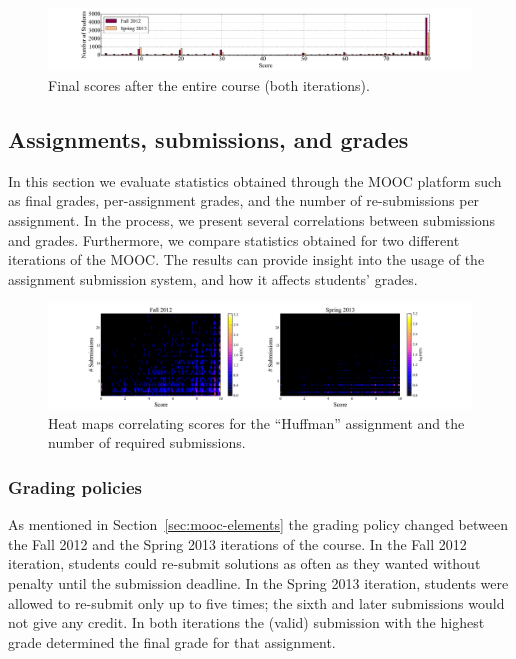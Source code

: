 \documentclass{sig-alternate}
\begin{document}
\begin{figure}[ht!]
  \centering
  \includegraphics[width=\textwidth]{plots/final-scores.pdf}
  \caption{Final scores after the entire course (both iterations).}
  \label{fig:final-scores}
\end{figure}

\subsection{Assignments, submissions, and grades}

In this section we evaluate statistics obtained through the MOOC platform such
as final grades, per-assignment grades, and the number of re-submissions per
assignment. In the process, we present several correlations between
submissions and grades. Furthermore, we compare statistics obtained for two
different iterations of the MOOC. The results can provide insight into the
usage of the assignment submission system, and how it affects students'
grades.


\begin{figure}[ht!]
  \centering
  \includegraphics[width=\textwidth]{plots/score-2d-histogram-fall2012-spring2013.pdf}
  \caption{Heat maps correlating scores for the ``Huffman'' assignment and the number
  of required submissions.}
  \label{fig:2d-histogram}
\end{figure}

\subsubsection{Grading policies}\label{sec:grading-policies}

As mentioned in Section~\ref{sec:mooc-elements} the grading policy changed
between the Fall 2012 and the Spring 2013 iterations of the course. In the
Fall 2012 iteration, students could re-submit solutions as often as they
wanted without penalty until the submission deadline. In the Spring 2013
iteration, students were allowed to re-submit only up to five times; the sixth
and later submissions would not give any credit. In both iterations the
(valid) submission with the highest grade determined the final grade for that
assignment.
\end{document}
